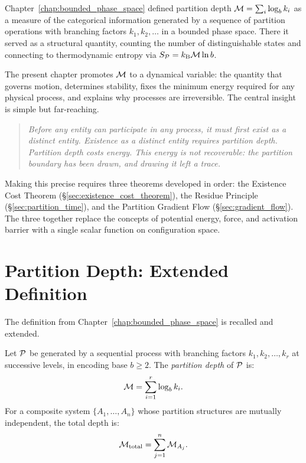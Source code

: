 Chapter~\ref{chap:bounded_phase_space} defined partition depth
$\mathcal{M} = \sum_i \log_b k_i$ as a measure of the categorical information
generated by a sequence of partition operations with branching factors
$k_1, k_2, \ldots$ in a bounded phase space. There it served as a
structural quantity, counting the number of distinguishable states and
connecting to thermodynamic entropy via $S_{\mathcal{P}} = k_{\mathrm{B}} \mathcal{M} \ln b$.

The present chapter promotes $\mathcal{M}$ to a dynamical variable: the quantity
that governs motion, determines stability, fixes the minimum energy required
for any physical process, and explains why processes are irreversible. The
central insight is simple but far-reaching.

\begin{quote}
\itshape
Before any entity can participate in any process, it must first exist as a
distinct entity. Existence as a distinct entity requires partition depth.
Partition depth costs energy. This energy is not recoverable: the partition
boundary has been drawn, and drawing it left a trace.
\end{quote}

Making this precise requires three theorems developed in order: the
Existence Cost Theorem (\S\ref{sec:existence_cost_theorem}), the Residue
Principle (\S\ref{sec:partition_time}), and the Partition Gradient Flow
(\S\ref{sec:gradient_flow}). The three together replace the concepts of
potential energy, force, and activation barrier with a single scalar function
on configuration space.

\section{Partition Depth: Extended Definition}
\label{sec:depth_extended}

The definition from Chapter~\ref{chap:bounded_phase_space} is recalled and
extended.

\begin{definition}
\label{def:partition_depth_ext}
Let $\mathcal{P}$ be generated by a sequential process with branching factors
$k_1, k_2, \ldots, k_r$ at successive levels, in encoding base $b \geq 2$.
The \emph{partition depth} of $\mathcal{P}$ is:
\begin{equation}
  \mathcal{M} = \sum_{i=1}^{r} \log_b k_i.
  \label{eq:depth_def}
\end{equation}
For a composite system $\{A_1, \ldots, A_n\}$ whose partition structures are
mutually independent, the total depth is:
\begin{equation}
  \mathcal{M}_{\mathrm{total}} = \sum_{j=1}^{n} \mathcal{M}_{A_j}.
  \label{eq:depth_additive}
\end{equation}
\end{definition}

